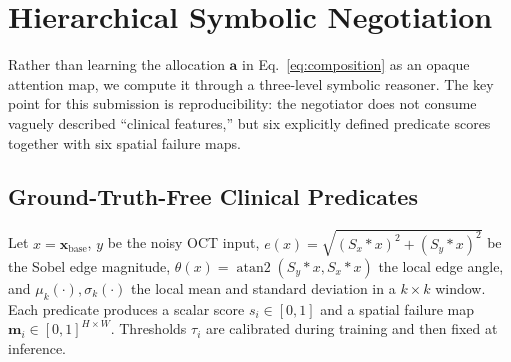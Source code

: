 \documentclass{ieeetj}
\begin{document}
\section{Hierarchical Symbolic Negotiation}
\label{sec:negotiator}

Rather than learning the allocation $\mathbf{a}$ in Eq.~\eqref{eq:composition} as an opaque attention map, we compute it through a three-level symbolic reasoner. The key point for this submission is reproducibility: the negotiator does not consume vaguely described ``clinical features,'' but six explicitly defined predicate scores together with six spatial failure maps.

\subsection{Ground-Truth-Free Clinical Predicates}
\label{sec:predicates}
Let $x=\hat{\mathbf{x}}_\text{base}$, $y$ be the noisy OCT input, $e(x)=\sqrt{(S_x*x)^2+(S_y*x)^2}$ be the Sobel edge magnitude, $\theta(x)=\operatorname{atan2}(S_y*x,S_x*x)$ the local edge angle, and $\mu_k(\cdot),\sigma_k(\cdot)$ the local mean and standard deviation in a $k\times k$ window. Each predicate produces a scalar score $s_i\in[0,1]$ and a spatial failure map $\mathbf{m}_i\in[0,1]^{H\times W}$. Thresholds $\tau_i$ are calibrated during training and then fixed at inference.
\end{document}
